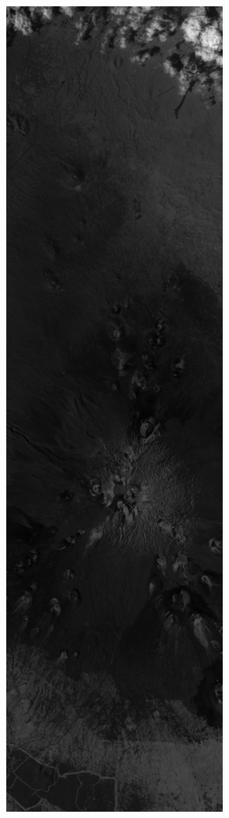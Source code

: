 \begin{figure}[]
\centering
\begin{subfigure}{0.48\textwidth}
  \centering
  \includegraphics[width=0.8\linewidth]{images/mauna_kea_sum.png}

\end{subfigure}
\end{figure}
